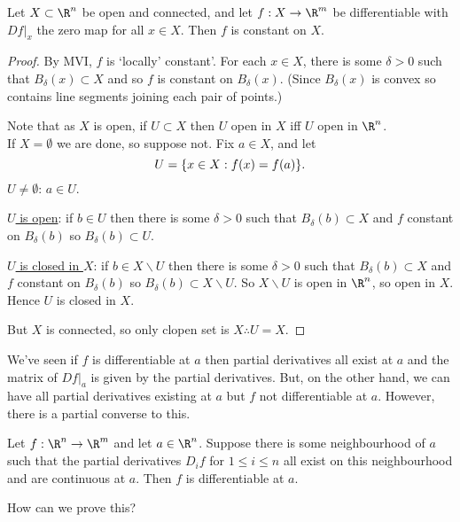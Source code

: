 \begin{corollary} \label{cor:2.8}
    Let $X\subset \R^n$ be open and connected, and let $f:X\to \R^m$ be differentiable with $Df|_x$ the zero map for all $x\in X$. Then $f$ is constant on $X$.
\end{corollary}

\begin{proof}
    By MVI, $f$ is `locally' constant'. For each $x\in X$, there is some $\delta > 0$ such that $B_\delta(x)\subset X$ and so $f$ is constant on $B_\delta(x)$. (Since $B_\delta(x)$ is convex so contains line segments joining each pair of points.) 
    
    Note that as $X$ is open, if $U\subset X$ then $U$ open in $X$ iff $U$ open in $\R^n$. \\
    If $X=\emptyset$ we are done, so suppose not.
    Fix $a\in X$, and let \[ U = \{x\in X : f(x) = f(a)\}. \]
    \underline{$U\neq \emptyset$}: $a\in U$.

    \underline{$U$ is open}: if $b\in U$ then there is some $\delta>0$ such that $B_\delta(b)\subset X$ and $f$ constant on $B_\delta(b)$ so $B_\delta(b)\subset U$.

    \underline{$U$ is closed in $X$}: if $b\in X\backslash U$ then there is some $\delta > 0$ such that $B_\delta(b) \subset X$ and $f$ constant on $B_\delta(b)$ so $B_\delta(b)\subset X\backslash U$. So $X\backslash U$ is open in $\R^n$, so open in $X$. Hence $U$ is closed in $X$.
    
    But $X$ is connected, so only clopen set is $X \therefore U =X$.
\end{proof}

We've seen if $f$ is differentiable at $a$ then partial derivatives all exist at $a$ and the matrix of $Df|_a$ is given by the partial derivatives.
But, on the other hand, we can have all partial derivatives existing at $a$ but $f$ not differentiable at $a$. 
However, there is a partial converse to this.

\begin{theorem} \label{thm:4.9}
    Let $f:\R^n\to\R^m$ and let $a\in \R^n$. Suppose there is some neighbourhood of $a$ such that the partial derivatives $D_if$ for $1\leq i \leq n$ all exist on this neighbourhood and are continuous at $a$.
    Then $f$ is differentiable at $a$. 
\end{theorem}

How can we prove this?

